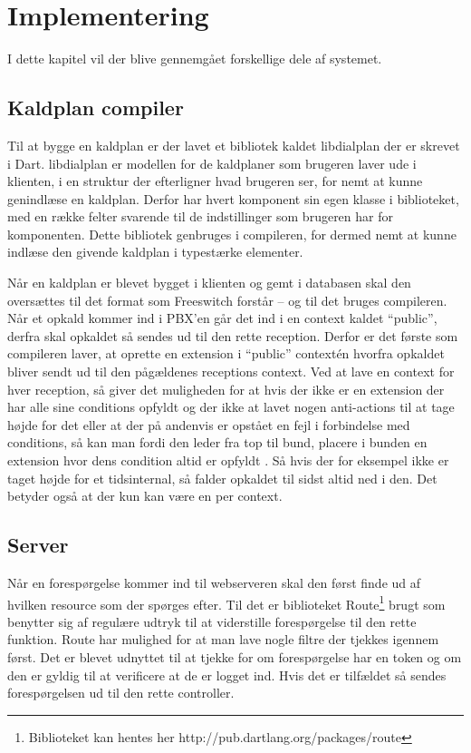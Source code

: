 \chapter{Implementering}

I dette kapitel vil der blive gennemgået forskellige dele af systemet.

\section{Kaldplan compiler}

Til at bygge en kaldplan er der lavet et bibliotek kaldet libdialplan der er skrevet i Dart. libdialplan er modellen for de kaldplaner som brugeren laver ude i klienten, i en struktur der efterligner hvad brugeren ser, for nemt at kunne genindlæse en kaldplan. Derfor har hvert komponent sin egen klasse i biblioteket, med en række felter svarende til de indstillinger som brugeren har for komponenten. Dette bibliotek genbruges i compileren, for dermed nemt at kunne indlæse den givende kaldplan i typestærke elementer.


Når en kaldplan er blevet bygget i klienten og gemt i databasen skal den oversættes til det format som Freeswitch forstår -- og til det bruges compileren. Når et opkald kommer ind i PBX'en går det ind i en context kaldet \enquote{public}, derfra skal opkaldet så sendes ud til den rette reception. Derfor er det første som compileren laver, at oprette en extension i \enquote{public} contextén hvorfra opkaldet bliver sendt ud til den pågældenes receptions context.
Ved at lave en context for hver reception, så giver det muligheden for at hvis der ikke er en extension der har alle sine conditions opfyldt og der ikke at lavet nogen anti-actions til at tage højde for det eller at der på andenvis er opstået en fejl i forbindelse med conditions, så kan man fordi den leder fra top til bund, placere i bunden en extension hvor dens condition altid er opfyldt \citep{minessale2012freeswitch}. Så hvis der for eksempel ikke er taget højde for et tidsinternal, så falder opkaldet til sidst altid ned i den. Det betyder også at der kun kan være en per context.

\section{Server}

Når en forespørgelse kommer ind til webserveren skal den først finde ud af hvilken resource som der spørges efter. Til det er biblioteket Route\footnote{Biblioteket kan hentes her http://pub.dartlang.org/packages/route} brugt som benytter sig af regulære udtryk til at viderstille forespørgelse til den rette funktion.
Route har mulighed for at man lave nogle filtre der tjekkes igennem først. Det er blevet udnyttet til at tjekke for om forespørgelse har en token og om den er gyldig til at verificere at de er logget ind. Hvis det er tilfældet så sendes forespørgelsen ud til den rette controller. 

